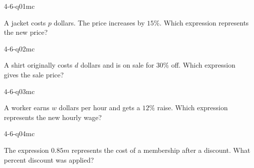 

\begin{practiceQuestion}{4-6-q01}{mc}
\begin{questionText}
A jacket costs $p$ dollars. The price increases by $15\%$. Which expression represents the new price?
\end{questionText}
\end{practiceQuestion}

\begin{practiceQuestion}{4-6-q02}{mc}
\begin{questionText}
A shirt originally costs $d$ dollars and is on sale for $30\%$ off. Which expression gives the sale price?
\end{questionText}
\end{practiceQuestion}

\begin{practiceQuestion}{4-6-q03}{mc}
\begin{questionText}
A worker earns $w$ dollars per hour and gets a $12\%$ raise. Which expression represents the new hourly wage?
\end{questionText}
\end{practiceQuestion}

\begin{practiceQuestion}{4-6-q04}{mc}
\begin{questionText}
The expression $0.85m$ represents the cost of a membership after a discount. What percent discount was applied?
\end{questionText}
\end{practiceQuestion}

